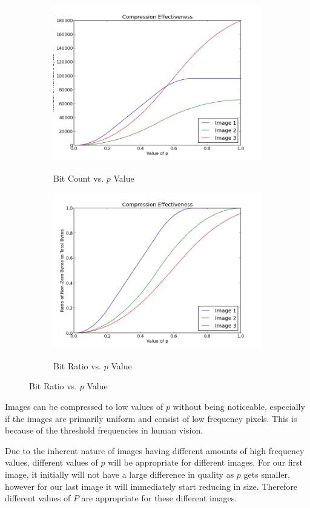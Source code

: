     \begin{figure}[ht]
        \centering
        \begin{subfigure}{0.41\textwidth}
            \includegraphics[scale=0.35]{./img/bitcount.png}
            \label{fig:bitcount}
            \caption{Bit Count vs. $p$ Value}
        \end{subfigure}
        \begin{subfigure}{0.41\textwidth}
            \includegraphics[scale=0.35]{./img/bitrat.png}
            \label{fig:bitrat}
            \caption{Bit Ratio vs. $p$ Value}
        \end{subfigure}
        \label{figs:bits}
    \end{figure}

Images can be compressed to low values of $p$ without being noticeable, especially if the images are primarily uniform and consist of low frequency pixels. This is because of the threshold frequencies in human vision.

Due to the inherent nature of images having different amounts of high frequency values, different values of $p$ will be appropriate for different images. For our first image, it initially will not have a large difference in quality as $p$ gets smaller, however for our last image it will immediately start reducing in size. Therefore different values of $P$ are appropriate for these different images.
